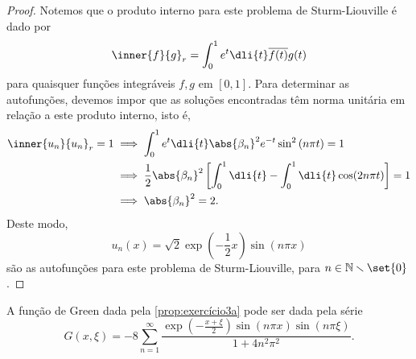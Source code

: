 \begin{proof}
    Notemos que o produto interno para este problema de Sturm-Liouville é dado por
    \begin{equation*}
        \inner{f}{g}_r = \int_{0}^{1} e^{t}\dli{t}\overline{f(t)}g(t)
    \end{equation*}
    para quaisquer funções integráveis \(f, g\) em \([0,1]\). Para determinar as autofunções, devemos impor que as soluções encontradas têm norma unitária em relação a este produto interno, isto é,
    \begin{align*}
        \inner{u_n}{u_n}_r = 1 &\implies \int_0^1 e^t \dli{t} \abs{\beta_n}^2 e^{-t}\sin^2\left(n\pi t\right) = 1\\
                               &\implies  \frac12\abs{\beta_n}^2 \left[\int_0^1 \dli{t} - \int_0^1 \dli{t} \cos(2n\pi t)\right] = 1\\
                               &\implies  \abs{\beta_n}^2 = 2.
    \end{align*}
    Deste modo,
    \begin{equation*}
        u_n(x) = \sqrt{2} \exp\left(-\frac{1}{2}x\right)\sin(n\pi x)
    \end{equation*}
    são as autofunções para este problema de Sturm-Liouville, para \(n \in \mathbb{N}\smallsetminus\set{0}\).
\end{proof}
\begin{corollary}
    A função de Green dada pela \cref{prop:exercício3a} pode ser dada pela série
    \begin{equation*}
        G(x, \xi) = - 8\sum_{n = 1}^\infty \frac{\exp\left(-\frac{x+\xi}2\right)\sin(n\pi x)\sin(n\pi \xi)}{1 + 4n^2\pi^2}.
    \end{equation*}
\end{corollary}

